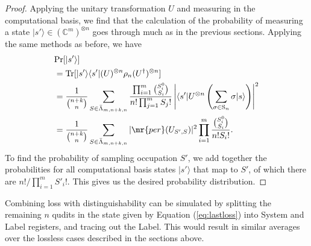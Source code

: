 \begin{proof}
Applying the unitary transformation $U$ and measuring in the computational basis, we find that the calculation of the probability of measuring a state $|s'\rangle \in (\mathbb{C}^m)^{\otimes n}$ goes through much as in the previous sections.
Applying the same methods as before, we have
\begin{align}
&\textrm{Pr}[|s'\rangle]\\
&= \textrm{Tr}[|s'\rangle\langle s'|(U)^{\otimes n}\rho_n (U^\dagger)^{\otimes n}]\\
&= \frac{1}{\binom{n+k}{n}}\sum_{S \in \bar{\Lambda}_{m,n+k,n}} \frac{\prod_{i=1}^m \binom{S_i^0}{S_i}}{n!\prod_{j=1}^m S_j!} \left|\langle s'|U^{\otimes n}\left(\sum_{\sigma \in \textrm{S}_n}\sigma|s\rangle\right)\right|^2\\
&= \frac{1}{\binom{n+k}{n}}\sum_{S \in \bar{\Lambda}_{m,n+k,n}} |\mr{per}(U_{S',S})|^2 \prod_{i=1}^m \frac{\binom{S_i^0}{S_i}}{n!S_i!} .
\end{align}
To find the probability of sampling occupation $S'$, we add together the probabilities for all computational basis states $|s'\rangle$ that map to $S'$, of which there are $n!/\prod_{i=1}^m S'_i!$. 
This gives us the desired probability distribution.
\end{proof}

Combining loss with distinguishability can be simulated by splitting the remaining $n$ qudits in the state given by Equation (\ref{eq:lastloss}) into System and Label registers, and tracing out the Label.
This would result in similar averages over the lossless cases described in the sections above.



